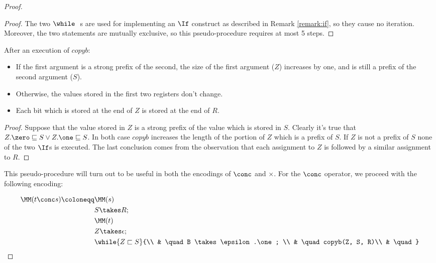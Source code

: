 \begin{proof}
\begin{proof}
The two $\while \ \ $s are used for implementing an $\If$ construct as described in Remark \ref{remark:if}, so they cause no iteration. Moreover, the two statements are mutually exclusive, so this pseudo-procedure requires at most 5 steps.
\end{proof}

\begin{lemma}
\label{lemma:corrcopyb}
After an execution of $copyb$:
\begin{itemize}
\item If the first argument is a strong prefix of the second, the size of the first argument ($Z$) increases by one, and is still a prefix of the second argument ($S$).
\item Otherwise, the values stored in the first two registers don't change.
\item Each bit which is stored at the end of $Z$ is stored at the end of $R$.
\end{itemize}
\end{lemma}

\begin{proof}
Suppose that the value stored in $Z$ is a strong prefix of the value which is stored in $S$. Clearly it's true that $Z.\zero \sqsubseteq S \lor Z.\one\sqsubseteq S$. In both case $copyb$ increases the length of the portion of $Z$ which is a prefix of $S$. If $Z$ is not a prefix of $S$ none of the two $\If$s is executed. The last conclusion comes from the observation that each assignment to $Z$ is followed by a similar assignment to $R$.
\end{proof}

This pseudo-procedure will turn out to be useful in both the encodings of $\conc$ and $\times$. For the $\conc$ operator, we proceed with the following encoding:

\begin{align*}
\MM(t \conc s)\coloneqq &\MM(s)\\
& S \takes R;\\
& \MM(t)\\
& Z \takes \epsilon; \\
& \while {Z \sqsubset S}{\\
& \quad B \takes \epsilon.\one; \\
& \quad copyb(Z, S, R)\\
& \quad }\\
\end{align*}


\end{proof}
